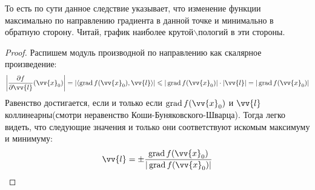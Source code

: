 \begin{anote}
	То есть по сути данное следствие указывает, что изменение функции максимально по направлению градиента в данной точке и минимально в обратную сторону. Читай, график наиболее крутой$\backslash$пологий в эти стороны.
\end{anote}

\begin{proof}
	Распишем модуль производной по направлению как скалярное произведение:
	\[
		\left|\pd{f}{\vv{l}} (\vv{x}_0)\right| = \left|\trbr{\grad f(\vv{x}_0), \vv{l}}\right| \le |\grad f(\vv{x}_0)|\cdot|\vv{l}|=|\grad f(\vv{x}_0)|
	\]
	Равенство достигается, если и только если $\grad f(\vv{x}_0)$ и $\vv{l}$ коллинеарны(смотри неравенство Коши-Буняковского-Шварца). Тогда легко видеть, что следующие значения и только они соответствуют искомым максимуму и минимуму: 
	\[
		\vv{l} = \pm \frac{\grad f(\vv{x}_0)}{|\grad f(\vv{x}_0)|}
	\]
\end{proof}